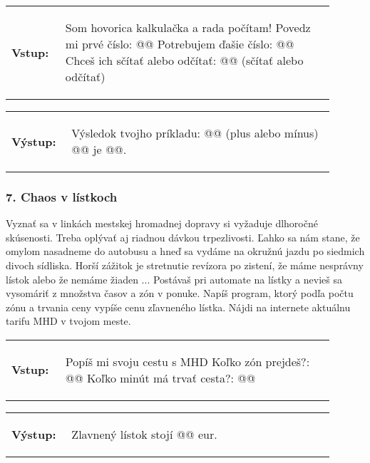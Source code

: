 \begin{tabular}{@{}p{0.15\linewidth}p{0.75\linewidth}}
\textbf{\small Vstup:} &
\vspace{-3em}
\begin{code}
Som hovorica kalkulačka a rada počítam!
Povedz mi prvé číslo: @\fbox{\phantom{vstup}}@
Potrebujem ďašie číslo: @\fbox{\phantom{vstup}}@
Chceš ich sčítať alebo odčítať: @\fbox{\phantom{vstup}}@ (sčítať alebo odčítať)
\end{code}
\end{tabular}

\vspace{-2em}
\begin{tabular}{@{}p{0.15\linewidth}p{0.75\linewidth}}
\textbf{\small Výstup:} &
\vspace{-3em}
\begin{code}
Výsledok tvojho príkladu: @\fbox{\phantom{vstup}}@ (plus alebo mínus) @\fbox{\phantom{vstup}}@ je @\fbox{\phantom{vstup}}@.
\end{code}
\end{tabular}
\vspace{-2em}

\subsubsection*{7. Chaos v lístkoch}
Vyznať sa v linkách mestskej hromadnej dopravy si vyžaduje dlhoročné skúsenosti. Treba oplývať aj riadnou dávkou trpezlivosti. Ľahko sa nám stane, že omylom nasadneme do autobusu a hneď sa vydáme na okružnú jazdu po siedmich divoch sídliska. Horší zážitok je stretnutie revízora po zistení, že máme nesprávny lístok alebo že nemáme žiaden ... Postávaš pri automate na lístky a nevieš sa vysomáriť z množstva časov a zón v ponuke. Napíš program, ktorý podľa počtu zónu a trvania ceny vypíše cenu zľavneného lístka. Nájdi na internete aktuálnu tarifu MHD v tvojom meste.

\begin{tabular}{@{}p{0.15\linewidth}p{0.75\linewidth}}
\textbf{\small Vstup:} &
\vspace{-3em}
\begin{code}
Popíš mi svoju cestu s MHD
Koľko zón prejdeš?: @\fbox{\phantom{vstup}}@
Koľko minút má trvať cesta?: @\fbox{\phantom{vstup}}@
\end{code}
\end{tabular}

\vspace{-2em}
\begin{tabular}{@{}p{0.15\linewidth}p{0.75\linewidth}}
\textbf{\small Výstup:} &
\vspace{-3em}
\begin{code}
Zlavnený lístok stojí @\fbox{\phantom{vstup}}@ eur.
\end{code}
\end{tabular}
\vspace{-2em}


